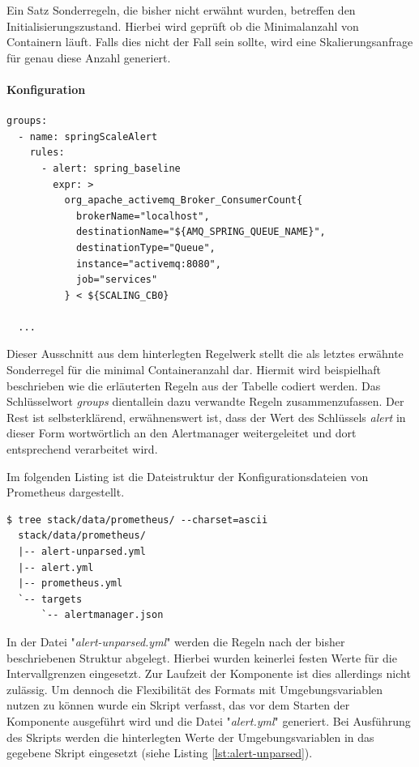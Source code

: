 Ein Satz Sonderregeln, die bisher nicht erwähnt wurden, betreffen den Initialisierungszustand. Hierbei wird geprüft ob die Minimalanzahl von Containern läuft. Falls dies nicht der Fall sein sollte, wird eine Skalierungsanfrage für genau diese Anzahl generiert.


\paragraph{Konfiguration \checkmark}

\begin{lstlisting}[style=bashStyle,caption={Umgebungsvariablen - Prometheus Regelsatz},label=lst:envMatrix]
  groups:
  - name: springScaleAlert
    rules:
      - alert: spring_baseline
        expr: >
          org_apache_activemq_Broker_ConsumerCount{
            brokerName="localhost",
            destinationName="${AMQ_SPRING_QUEUE_NAME}", 
            destinationType="Queue",
            instance="activemq:8080", 
            job="services"
          } < ${SCALING_CB0} 

  ...

\end{lstlisting}

Dieser Ausschnitt aus dem hinterlegten Regelwerk stellt die als letztes erwähnte Sonderregel für die minimal Containeranzahl dar. Hiermit wird beispielhaft beschrieben wie die erläuterten Regeln aus der Tabelle codiert werden. Das Schlüsselwort \emph{groups} dientallein dazu verwandte Regeln zusammenzufassen. Der Rest ist selbsterklärend, erwähnenswert ist, dass der Wert des Schlüssels \emph{alert} in dieser Form wortwörtlich an den Alertmanager weitergeleitet und dort entsprechend verarbeitet wird.

Im folgenden Listing ist die Dateistruktur der Konfigurationsdateien von Prometheus dargestellt.

\begin{lstlisting}[style=bashStyle,caption={Umgebungsvariablen - Prometheus Regelsatz},label=lst:envMatrix]
  $ tree stack/data/prometheus/ --charset=ascii
  stack/data/prometheus/
  |-- alert-unparsed.yml
  |-- alert.yml
  |-- prometheus.yml
  `-- targets
      `-- alertmanager.json
\end{lstlisting}

In der Datei "\emph{alert-unparsed.yml}" werden die Regeln nach der bisher beschriebenen Struktur abgelegt. Hierbei wurden keinerlei festen Werte für die Intervallgrenzen eingesetzt. Zur Laufzeit der Komponente ist dies allerdings nicht zulässig. Um dennoch die Flexibilität des Formats mit Umgebungsvariablen nutzen zu können wurde ein Skript verfasst, das vor dem Starten der Komponente ausgeführt wird und die Datei "\emph{alert.yml}" generiert. Bei Ausführung des Skripts werden die hinterlegten Werte der Umgebungsvariablen in das gegebene Skript eingesetzt (siehe Listing \ref{lst:alert-unparsed}). 

